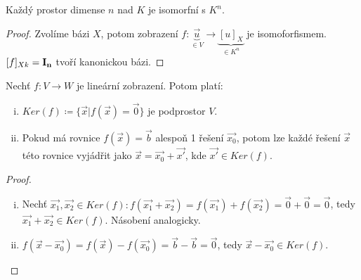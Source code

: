 \begin{proposition}
    Každý prostor dimense $n$ nad $K$ je isomorfní s $K^n$.
\end{proposition}

\begin{proof}
    Zvolíme bázi $X$, potom zobrazení $f: \underbrace{\vec{u}}_{\in V} 
    \rightarrow \underbrace{[u]_X}_{\in K^n}$ je isomoforfismem. 
    $[f]_{Xk} = \mathbf{I_n}$ tvoří kanonickou bázi.
\end{proof}

\begin{proposition}
    Nechť $f: V \rightarrow W$ je lineární zobrazení. Potom platí:
    \begin{enumerate}[i.]
        \item $Ker(f) \coloneqq \{\vec{x} | f(\vec{x}) = \vec{0}\}$ je 
            podprostor $V$.
        \item Pokud má rovnice $f(\vec{x}) = \vec{b}$ alespoň 1 řešení 
			$\vec{x_0}$, potom lze každé řešení $\vec{x}$ této rovnice 
			vyjádřit jako $\vec{x} = \vec{x_0} + \vec{x'}$, kde 
			$\vec{x'} \in Ker(f)$.
    \end{enumerate}
\end{proposition}

\begin{proof}
    \leavevmode
    \begin{enumerate}[i.]
        \item Nechť $\vec{x_1}, \vec{x_2} \in Ker(f): f(\vec{x_1} + \vec{x_2})
            = f(\vec{x_1}) + f(\vec{x_2}) = \vec{0} + \vec{0} = \vec{0}$, tedy
            $\vec{x_1} + \vec{x_2} \in Ker(f)$. Násobení analogicky.
        \item $f(\vec{x} - \vec{x_0}) = f(\vec{x}) - f(\vec{x_0}) = \vec{b}
            - \vec{b} = \vec{0}$, tedy $\vec{x} - \vec{x_0} \in Ker(f)$.
    \end{enumerate}
\end{proof}
